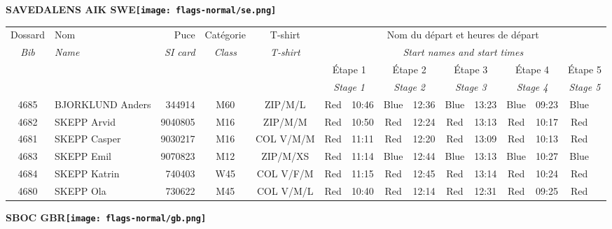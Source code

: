 \documentclass{report}
\begin{document}
\newpage
  \Huge \centering \bfseries SAVEDALENS AIK  SWE\normalfont \footnotesize \sffamily \hfill \texttt{[image: flags-normal/se.png]} \newline 
  \begin{longtable}{|c|l|r|c|c|*{5}{cc|}}
    Dossard & Nom  & Puce    & Catégorie & T-shirt & \multicolumn{10}{c|}{Nom du départ et heures de départ} \\
    \itshape Bib     & \itshape Name & \itshape SI card & \itshape Class  & \itshape  T-shirt  & \multicolumn{10}{c|}{\itshape Start names and start times} \\
    \hline
    & & & & & \multicolumn{2}{c|}{Étape 1} & \multicolumn{2}{c|}{Étape 2} & \multicolumn{2}{c|}{Étape 3} & \multicolumn{2}{c|}{Étape 4} & \multicolumn{2}{c|}{Étape 5} \\
    & & & & & \multicolumn{2}{c|}{\itshape Stage 1} & \multicolumn{2}{c|}{\itshape Stage 2} & \multicolumn{2}{c|}{\itshape Stage 3} & \multicolumn{2}{c|}{\itshape Stage 4} & \multicolumn{2}{c|}{\itshape Stage 5} \\
    \hline
    4685 & BJORKLUND Anders & 344914 & M60 & ZIP/M/L & Red & 10:46 & Blue & 12:36 & Blue & 13:23 & Blue & 09:23 & Blue &  \\
    4682 & SKEPP Arvid & 9040805 & M16 & ZIP/M/M & Red & 10:50 & Red & 12:24 & Red & 13:13 & Red & 10:17 & Red &  \\
    4681 & SKEPP Casper & 9030217 & M16 & COL V/M/M & Red & 11:11 & Red & 12:20 & Red & 13:09 & Red & 10:13 & Red &  \\
    4683 & SKEPP Emil & 9070823 & M12 & ZIP/M/XS & Red & 11:14 & Blue & 12:44 & Blue & 13:13 & Blue & 10:27 & Blue &  \\
    4684 & SKEPP Katrin & 740403 & W45 & COL V/F/M & Red & 11:15 & Red & 12:45 & Red & 13:14 & Red & 10:24 & Red &  \\
    4680 & SKEPP Ola & 730622 & M45 & COL V/M/L & Red & 10:40 & Red & 12:14 & Red & 12:31 & Red & 09:25 & Red &  \\
  \end{longtable}
\newpage
  \Huge \centering \bfseries SBOC  GBR\normalfont \footnotesize \sffamily \hfill \texttt{[image: flags-normal/gb.png]} \newline 
\end{document}
